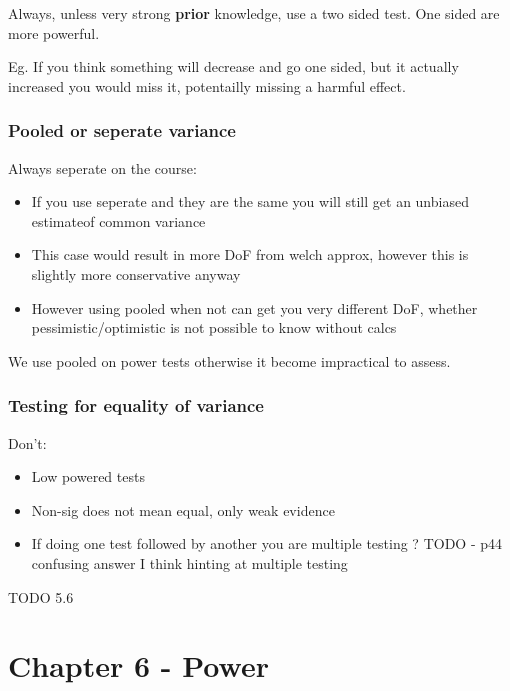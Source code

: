 \documentclass[
  letterpaper,
  DIV=11,
  numbers=noendperiod]{scrreprt}
\providecommand{\tightlist}{%
  \setlength{\itemsep}{0pt}\setlength{\parskip}{0pt}}\usepackage{longtable,booktabs,array}
\begin{document}
Always, unless very strong \textbf{prior} knowledge, use a two sided
test. One sided are more powerful.

Eg. If you think something will decrease and go one sided, but it
actually increased you would miss it, potentailly missing a harmful
effect.

\hypertarget{pooled-or-seperate-variance}{%
\subsubsection{Pooled or seperate
variance}\label{pooled-or-seperate-variance}}

Always seperate on the course:

\begin{itemize}
\tightlist
\item
  If you use seperate and they are the same you will still get an
  unbiased estimateof common variance
\item
  This case would result in more DoF from welch approx, however this is
  slightly more conservative anyway
\item
  However using pooled when not can get you very different DoF, whether
  pessimistic/optimistic is not possible to know without calcs
\end{itemize}

We use pooled on power tests otherwise it become impractical to assess.

\hypertarget{testing-for-equality-of-variance}{%
\subsubsection{Testing for equality of
variance}\label{testing-for-equality-of-variance}}

Don't:

\begin{itemize}
\tightlist
\item
  Low powered tests
\item
  Non-sig does not mean equal, only weak evidence
\item
  If doing one test followed by another you are multiple testing ? TODO
  - p44 confusing answer I think hinting at multiple testing
\end{itemize}

TODO 5.6

\hypertarget{chapter-6---power}{%
\section{Chapter 6 - Power}\label{chapter-6---power}}
\end{document}
